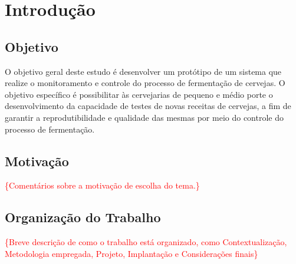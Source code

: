 \chapter{Introdução}

\section{Objetivo}

O objetivo geral deste estudo é desenvolver um protótipo de um sistema que realize o monitoramento e controle do processo de fermentação de cervejas.
O objetivo específico é possibilitar às cervejarias de pequeno e médio porte o desenvolvimento da capacidade de testes de novas receitas de cervejas, 
a fim de garantir a reprodutibilidade e qualidade das mesmas por meio do controle do processo de fermentação.

\section{Motivação}
\textcolor{red}{\{Comentários sobre a motivação de escolha do tema.\}}

\section{Organização do Trabalho}

\textcolor{red}{\{Breve descrição de como o trabalho está organizado, como Contextualização, Metodologia empregada, Projeto, Implantação e Considerações finais\}}

